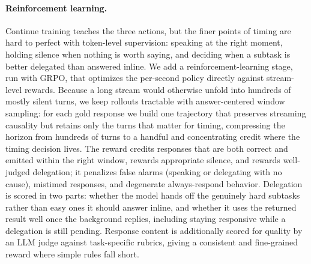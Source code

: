 \documentclass{llmxive}
\begin{document}
\paragraph{\textbf{Reinforcement learning.}}
Continue training teaches the three actions, but the finer points of timing are hard to perfect with token-level supervision: speaking at the right moment, holding silence when nothing is worth saying, and deciding when a subtask is better delegated than answered inline. We add a reinforcement-learning stage, run with GRPO, that optimizes the per-second policy directly against stream-level rewards. Because a long stream would otherwise unfold into hundreds of mostly silent turns, we keep rollouts tractable with answer-centered window sampling: for each gold response we build one trajectory that preserves streaming causality but retains only the turns that matter for timing, compressing the horizon from hundreds of turns to a handful and concentrating credit where the timing decision lives.
The reward credits responses that are both correct and emitted within the right window, rewards appropriate silence, and rewards well-judged delegation; it penalizes false alarms (speaking or delegating with no cause), mistimed responses, and degenerate always-respond behavior. Delegation is scored in two parts: whether the model hands off the genuinely hard subtasks rather than easy ones it should answer inline, and whether it uses the returned result well once the background replies, including staying responsive while a delegation is still pending. Response content is additionally scored for quality by an LLM judge against task-specific rubrics, giving a consistent and fine-grained reward where simple rules fall short.

\end{document}
